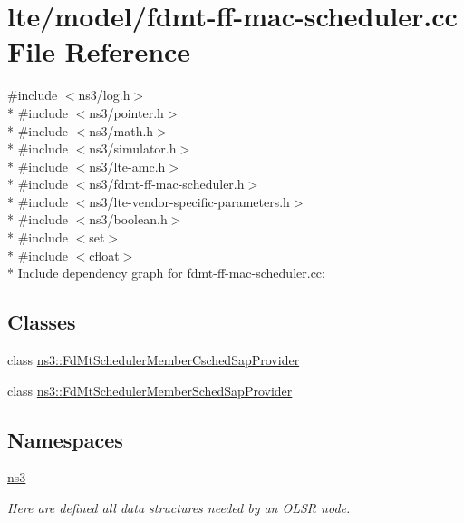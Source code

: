 \hypertarget{fdmt-ff-mac-scheduler_8cc}{}\section{lte/model/fdmt-\/ff-\/mac-\/scheduler.cc File Reference}
\label{fdmt-ff-mac-scheduler_8cc}
{\ttfamily \#include $<$ns3/log.\+h$>$}\\*
{\ttfamily \#include $<$ns3/pointer.\+h$>$}\\*
{\ttfamily \#include $<$ns3/math.\+h$>$}\\*
{\ttfamily \#include $<$ns3/simulator.\+h$>$}\\*
{\ttfamily \#include $<$ns3/lte-\/amc.\+h$>$}\\*
{\ttfamily \#include $<$ns3/fdmt-\/ff-\/mac-\/scheduler.\+h$>$}\\*
{\ttfamily \#include $<$ns3/lte-\/vendor-\/specific-\/parameters.\+h$>$}\\*
{\ttfamily \#include $<$ns3/boolean.\+h$>$}\\*
{\ttfamily \#include $<$set$>$}\\*
{\ttfamily \#include $<$cfloat$>$}\\*
Include dependency graph for fdmt-\/ff-\/mac-\/scheduler.cc\+:
\subsection*{Classes}
\begin{DoxyCompactItemize}
\item 
class \hyperlink{classns3_1_1FdMtSchedulerMemberCschedSapProvider}{ns3\+::\+Fd\+Mt\+Scheduler\+Member\+Csched\+Sap\+Provider}
\item 
class \hyperlink{classns3_1_1FdMtSchedulerMemberSchedSapProvider}{ns3\+::\+Fd\+Mt\+Scheduler\+Member\+Sched\+Sap\+Provider}
\end{DoxyCompactItemize}
\subsection*{Namespaces}
\begin{DoxyCompactItemize}
\item 
 \hyperlink{namespacens3}{ns3}
\begin{DoxyCompactList}\small\item\em Here are defined all data structures needed by an O\+L\+SR node. \end{DoxyCompactList}\end{DoxyCompactItemize}
